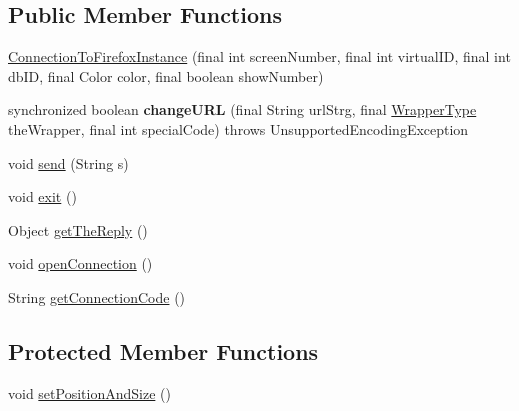 \subsection*{Public Member Functions}
\begin{DoxyCompactItemize}
\item 
\hyperlink{classgov_1_1fnal_1_1ppd_1_1dd_1_1display_1_1client_1_1ConnectionToFirefoxInstance_a0b6c291a19a9d5778cfd1052982ef1fc}{Connection\-To\-Firefox\-Instance} (final int screen\-Number, final int virtual\-I\-D, final int db\-I\-D, final Color color, final boolean show\-Number)
\item 
\hypertarget{classgov_1_1fnal_1_1ppd_1_1dd_1_1display_1_1client_1_1ConnectionToFirefoxInstance_a7425087b445dd65abfdd9ffcf75a67b0}{synchronized boolean {\bfseries change\-U\-R\-L} (final String url\-Strg, final \hyperlink{enumgov_1_1fnal_1_1ppd_1_1dd_1_1display_1_1client_1_1WrapperType}{Wrapper\-Type} the\-Wrapper, final int special\-Code)  throws Unsupported\-Encoding\-Exception }\label{classgov_1_1fnal_1_1ppd_1_1dd_1_1display_1_1client_1_1ConnectionToFirefoxInstance_a7425087b445dd65abfdd9ffcf75a67b0}

\item 
void \hyperlink{classgov_1_1fnal_1_1ppd_1_1dd_1_1display_1_1client_1_1ConnectionToFirefoxInstance_a61024ac5b3a4e83d69019c7173f3fdc6}{send} (String s)
\item 
void \hyperlink{classgov_1_1fnal_1_1ppd_1_1dd_1_1display_1_1client_1_1ConnectionToFirefoxInstance_a92f7cf0d6e41dfa04c69d1a11f112c0b}{exit} ()
\item 
Object \hyperlink{classgov_1_1fnal_1_1ppd_1_1dd_1_1display_1_1client_1_1ConnectionToFirefoxInstance_ac6abbef452771d5e7eb9df180cc785c4}{get\-The\-Reply} ()
\item 
void \hyperlink{classgov_1_1fnal_1_1ppd_1_1dd_1_1display_1_1client_1_1ConnectionToFirefoxInstance_aa2327027927970e438ba476c54255fd6}{open\-Connection} ()
\item 
String \hyperlink{classgov_1_1fnal_1_1ppd_1_1dd_1_1display_1_1client_1_1ConnectionToFirefoxInstance_aea4676306a5e4eca0e07232bb817040a}{get\-Connection\-Code} ()
\end{DoxyCompactItemize}
\subsection*{Protected Member Functions}
\begin{DoxyCompactItemize}
\item 
void \hyperlink{classgov_1_1fnal_1_1ppd_1_1dd_1_1display_1_1client_1_1ConnectionToFirefoxInstance_a7d4e2388c1ef1e5b954393047cdef5bf}{set\-Position\-And\-Size} ()
\end{DoxyCompactItemize}
